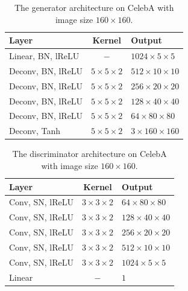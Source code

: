 \documentclass[letterpaper]{article} %
\begin{document}
\begin{table}[H] \centering
	\caption{The generator architecture on CelebA with image size $160 \times 160$.}\label{tab:network_CelebA_G_160}
	\begin{tabular}{lcl}\hline\hline
		Layer              & Kernel           & Output                \\ \hline
		Linear, BN, lReLU  & $-$              & $1024\times5\times5$  \\ \hline
		Deconv, BN, lReLU & $5\times5\times2$ & $512\times10\times10$ \\ \hline
		Deconv, BN, lReLU & $5\times5\times2$ & $256\times20\times20$ \\ \hline
		Deconv, BN, lReLU & $5\times5\times2$ & $128\times40\times40$ \\ \hline
		Deconv, BN, lReLU & $5\times5\times2$ & $64\times80\times80$  \\ \hline
		Deconv, Tanh      & $5\times5\times2$ & $3\times160\times160$ \\ \hline\hline
	\end{tabular}
\end{table}
\begin{table}[H]\centering
	\caption{The discriminator architecture on CelebA with image size $160 \times 160$.}\label{tab:network_CelebA_D_160}
	\begin{tabular}{lcl}\hline\hline
		Layer              & Kernel           & Output           \\ \hline
		Conv, SN, lReLU  & $3\times3\times2$ & $64\times80\times80$  \\ \hline
		Conv, SN, lReLU  & $3\times3\times2$ & $128\times40\times40$ \\ \hline
		Conv, SN, lReLU  & $3\times3\times2$ & $256\times20\times20$ \\ \hline
		Conv, SN, lReLU  & $3\times3\times2$ & $512\times10\times10$ \\ \hline
		Conv, SN, lReLU  & $3\times3\times2$ & $1024\times5\times5$  \\ \hline
		Linear       & $-$               & $1$                   \\ \hline\hline
	\end{tabular}
\end{table}
\end{document}
